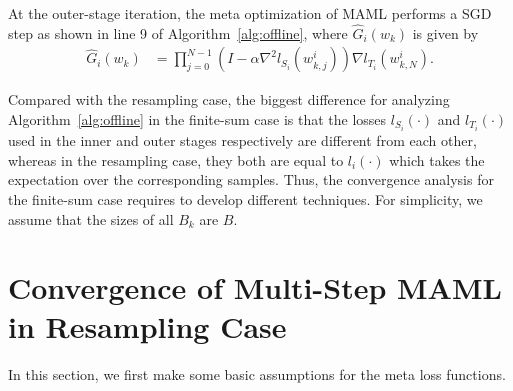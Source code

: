 \documentclass{osudissert96}
\begin{document}
At the outer-stage iteration, the meta optimization of MAML performs a SGD step as shown in line 9 of Algorithm~\ref{alg:offline},  where $ \widehat G_i(w_k) $ is given by 
\begin{align}\label{offline:obj}
 \widehat G_i(w_k) &=\prod_{j=0}^{N-1}(I - \alpha \nabla^2 l_{S_i}(w_{k,j}^i))\nabla l_{T_i}(w_{k,N}^i).
\end{align}

Compared with the resampling case, the biggest difference for analyzing Algorithm~\ref{alg:offline} in the finite-sum case is that the losses $ l_{S_i}(\cdot)$ and $ l_{T_i}(\cdot)$ used in the inner and outer stages respectively are different from each other,  whereas in the resampling case, they both are equal to $l_i(\cdot)$ which takes the expectation over the corresponding samples. 
Thus, the convergence analysis for the finite-sum case  requires to develop different techniques.  For simplicity, we assume that the sizes of all $B_k$ are $B$.

\section{Convergence of Multi-Step MAML in Resampling Case} \label{theory:online}
In this section, we first make some basic assumptions for the meta loss functions. 
\end{document}
